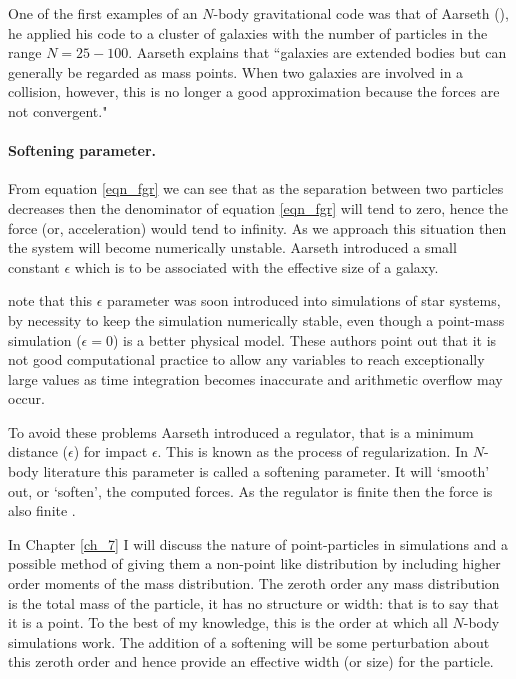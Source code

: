 One of the first examples of an $N$-body gravitational code was that of Aarseth (\citeyear{bib_aar2}), he applied his code to a cluster of galaxies with the number of particles in the range $N = 25 - 100$. Aarseth explains that ``galaxies are extended bodies but can generally be regarded as mass points. When two galaxies are involved in a collision, however, this is no longer a good approximation because the forces are not convergent."

\paragraph{Softening parameter.}
From equation \ref{eqn_fgr} we can see that as the separation between two particles decreases then the denominator of equation \ref{eqn_fgr} will tend to zero, hence the force (or, acceleration) would tend to infinity. As we approach this situation then the system will become numerically unstable. Aarseth introduced a small constant $\epsilon$ which is to be associated with the effective size of a galaxy.

\citet{bib_he} note that this $\epsilon$ parameter was soon introduced into simulations of star systems, by necessity to keep the simulation numerically stable, even though a point-mass simulation ($\epsilon = 0$) is a better physical model. These authors point out that it is not good computational practice to allow any variables to reach exceptionally large values as time integration becomes inaccurate and arithmetic overflow may occur.

To avoid these problems Aarseth introduced a regulator, that is a minimum distance ($\epsilon$) for impact $\epsilon$.
This is known as the process of regularization. In $N$-body literature this parameter is called a softening parameter. It will `smooth' out, or `soften', the computed forces. As the regulator is finite then the force is also finite \citep{bib_aar, bib_heg}.

In Chapter \ref{ch_7} I will discuss the nature of point-particles in simulations and a possible method of giving them a non-point like distribution by including higher order moments of the mass distribution. The zeroth order any mass distribution is the total mass of the particle, it has no structure or width: that is to say that it is a point. To the best of my knowledge, this is the order at which all $N$-body simulations work. The addition of a softening will be some perturbation about this zeroth order and hence provide an effective width (or size) for the particle.

